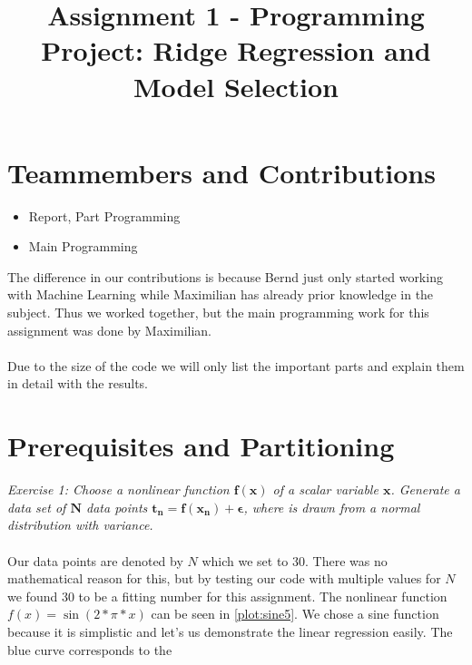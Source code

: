 \documentclass{article}
\begin{document}
	\title{Assignment 1 - Programming Project: Ridge Regression and Model Selection}
	\maketitle
	
	\section{Teammembers and Contributions}
	\begin{itemize}
		\item {} Report, Part Programming
		\item {} Main Programming
	\end{itemize}
	The difference in our contributions is because Bernd just only started working with Machine Learning while Maximilian has already prior knowledge in the subject. Thus we worked together, but the main programming work for this assignment was done by Maximilian.\\
	\\
	Due to the size of the code we will only list the important parts and explain them in detail with the results. 
	
	\section{Prerequisites and Partitioning} 
	\textit{Exercise 1: Choose a nonlinear function $\mathbf{f(x)}$ of a scalar variable $\mathbf{x}$. Generate a data set of $\mathbf{N}$ data points $\mathbf{t_n = f(x_n) + \epsilon}$, where is drawn from a normal distribution with variance.}\\
	\\
	Our data points are denoted by $N$ which we set to 30. There was no mathematical reason for this, but by testing our code with multiple values for $N$ we found 30 to be a fitting number for this assignment. The nonlinear function $f(x) = \sin(2*\pi*x)$ can be seen in \autoref{plot:sine5}. We chose a sine function because it is simplistic and let's us demonstrate the linear regression easily. The blue curve corresponds to the 
	
	
\end{document}
